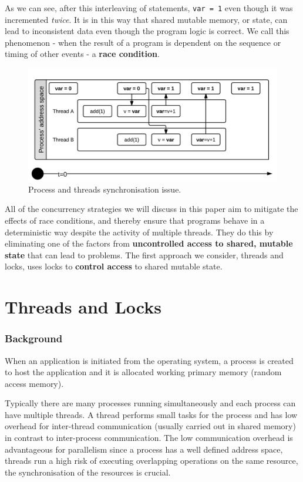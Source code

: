 \documentclass[a4paper,12pt]{kth-mag}
\begin{document}
As we can see, after this interleaving of statements, \texttt{var = 1} even though it was incremented \textit{twice}. It is in this way that shared mutable memory, or state, can lead to inconsistent data even though the program logic is correct. We call this phenomenon - when the result of a program is dependent on the sequence or timing of other events - a \textbf{race condition}.

\begin{figure}[H]
\begin{center}
    \includegraphics{images/ProcessAndThreads.png}
\caption{Process and threads synchronisation issue.}\label{fig:pat_sync_issue}
\end{center}
\end{figure}

All of the concurrency strategies we will discuss in this paper aim to mitigate the effects of race conditions, and thereby ensure that programs behave in a deterministic way despite the activity of multiple threads. They do this by eliminating one of the factors from \textbf{uncontrolled access to shared, mutable state} that can lead to problems. The first approach we consider, threads and locks, uses locks to \textbf{control access} to shared mutable state.

\part{Threads and Locks}

\section{Background}
When an application is initiated from the operating system, a process is created to host the application and it is allocated working primary memory (random access memory). 

Typically there are many processes running simultaneously and each process can have multiple threads. A thread performs small tasks for the process and has low overhead for inter-thread communication (usually carried out in shared memory) in contrast to inter-process communication. The low communication overhead is advantageous for parallelism since a process has a well defined address space, threads run a high risk of executing overlapping operations on the same resource, the synchronisation of the resources is crucial.
\end{document}
